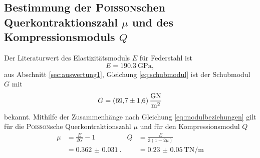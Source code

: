 \subsection{Bestimmung der \texorpdfstring{\textsc{Poisson}schen Querkontraktionszahl $\mu$}{Poissonschen Querkontraktionszahl} und des Kompressionsmoduls \texorpdfstring{$Q$}{Q}}
\label{sec:auswertung4}
Der Literaturwert des Elastizitätsmoduls $E$ für Federstahl \cite{federstahl} ist
\begin{equation}
	E = \SI{190,3}{\giga\pascal},
\end{equation}
aus Abschnitt \ref{sec:auswertung1}, Gleichung \eqref{eq:schubmodul} ist der Schubmodul $G$ mit
\begin{equation}
	G=	\SI{69.7\pm1.6}{\giga\newton\per\meter\squared}
\end{equation}
bekannt.
Mithilfe der Zusammenhänge nach Gleichung \eqref{eq:modulbeziehungen} gilt für die \textsc{Poisson}sche Querkontraktionszahl $\mu$ und für den Kompressionsmodul $Q$
\begin{align}
	\mu &= \frac{E}{2G}-1 & Q 	&= \frac{E}{3(1-2\mu)}\\
		&= \SI{0.362(31)}{}.& &= \SI{0.23(5)}{\tera\newton\per\meter}
	\label{eq:mu}
\end{align}
